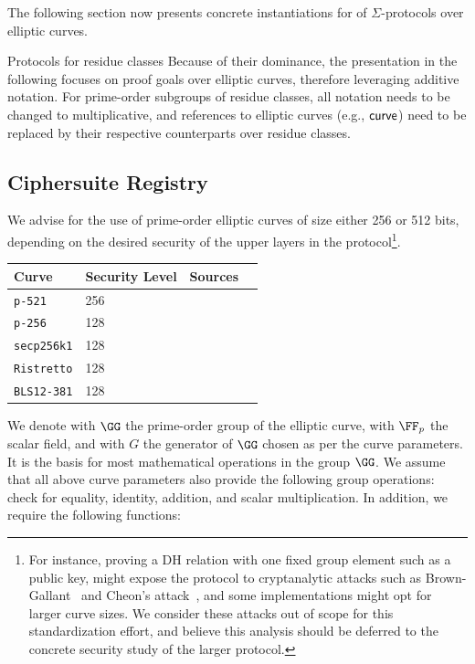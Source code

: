 \documentclass[11pt]{article}
\begin{document}
The following section now presents concrete instantiations for of $\Sigma$-protocols over elliptic curves.

\begin{remark}{Protocols for residue classes}{}
  Because of their dominance, the presentation in the following focuses on proof goals over elliptic curves, therefore leveraging additive notation.
	For prime-order subgroups of residue classes, all notation needs to be changed to multiplicative, and references to elliptic curves (e.g., $\textsf{curve}$) need to be replaced by their respective counterparts over residue classes.
\end{remark}

\subsection{Ciphersuite Registry}
 We advise for the use of prime-order elliptic curves of size either 256 or 512 bits, depending on the desired security of the upper layers in the protocol\footnote{For instance, proving a DH relation with one fixed group element such as a public key, might expose the protocol to cryptanalytic attacks such as Brown-Gallant~\cite{EPRINT:BroGal04} and Cheon’s attack~\cite{EC:Cheon06}, and some implementations might opt for larger curve sizes. We consider these attacks out of scope for this standardization effort, and believe this analysis should be deferred to the concrete security study of the larger protocol.}.

 \vspace{1em}
 \begin{center}
 \begin{tabular}{llcc}
  \hline
  Curve  & Security Level & Sources \\
  \hline
  \verb|p-521|     & 256& \cite{fips2} \\
  \verb|p-256|     & 128 & \cite{fips2}  \\
  \verb|secp256k1| & 128 & \cite{SECG} \\
  \verb|Ristretto| & 128 & \cite{cfrg-ristretto-decaf} \\
  \verb|BLS12-381| & 128 & \cite{bls12} \\
 \end{tabular}
\end{center}
We denote with $\GG$ the prime-order group of the elliptic curve, with $\FF_p$ the scalar field, and with $G$ the generator of $\GG$ chosen as per the curve parameters. It is the basis for most mathematical operations in the group $\GG$.
We assume that all above curve parameters also provide the following group operations: check for equality, identity, addition, and scalar multiplication.
In addition, we require the following functions:
\end{document}
